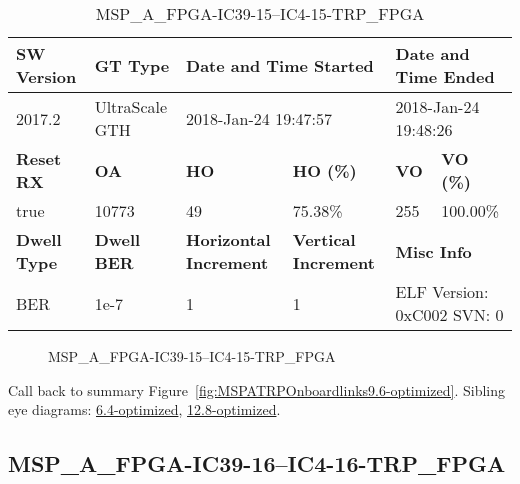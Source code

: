 \begin{table}[h]
\centering
\caption{MSP\_A\_FPGA-IC39-15--IC4-15-TRP\_FPGA}
\label{tab:MSPAFPGAIC3915IC415TRPFPGA9.6-optimized}
\begin{tabular}{@{}|l|l|l|l|l|l|@{}}
\toprule
\textbf{SW Version}                & \textbf{GT Type}   & \multicolumn{2}{l|}{\textbf{Date and Time Started}}            & \multicolumn{2}{l|}{\textbf{Date and Time Ended}}        \\ \midrule
2017.2                       & UltraScale GTH          & \multicolumn{2}{l|}{2018-Jan-24 19:47:57}                   & \multicolumn{2}{l|}{2018-Jan-24 19:48:26}               \\ \midrule
\textbf{Reset RX}                  & \textbf{OA} & \textbf{HO}   & \textbf{HO (\%)} & \textbf{VO} & \textbf{VO (\%)} \\ \midrule
true & 10773        & 49          & 75.38\%        & 255        & 100.00\%       \\ \midrule
\textbf{Dwell Type}                & \textbf{Dwell BER} & \textbf{Horizontal Increment} & \textbf{Vertical Increment}    & \multicolumn{2}{l|}{\textbf{Misc Info}}                  \\ \midrule
BER                            & 1e-7        & 1        & 1           & \multicolumn{2}{l|}{ELF Version: 0xC002 SVN: 0}                         \\ \bottomrule
\end{tabular}
\end{table}

\begin{figure}[h]
\caption{MSP\_A\_FPGA-IC39-15--IC4-15-TRP\_FPGA} \label{fig:MSPAFPGAIC3915IC415TRPFPGA9.6-optimized}
\end{figure}

Call back to summary Figure~\ref{fig:MSPATRPOnboardlinks9.6-optimized}.
Sibling eye diagrams: \hyperref[sec:MSPAFPGAIC3915IC415TRPFPGA6.4-optimized]{6.4-optimized}, \hyperref[sec:MSPAFPGAIC3915IC415TRPFPGA12.8-optimized]{12.8-optimized}.

\clearpage
\newpage


\subsection{MSP\_A\_FPGA-IC39-16--IC4-16-TRP\_FPGA}\label{sec:MSPAFPGAIC3916IC416TRPFPGA9.6-optimized}

